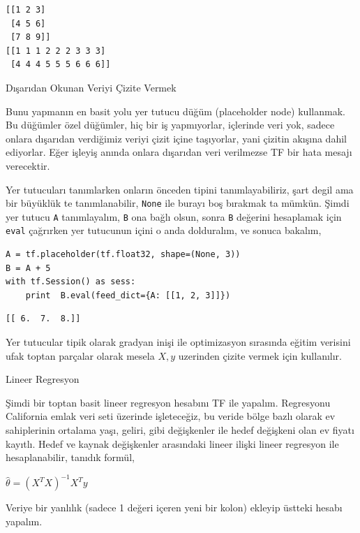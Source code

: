 \documentclass[12pt,fleqn]{article}\usepackage{../../common}
\begin{document}
\begin{verbatim}
[[1 2 3]
 [4 5 6]
 [7 8 9]]
[[1 1 1 2 2 2 3 3 3]
 [4 4 4 5 5 5 6 6 6]]
\end{verbatim}


Dışarıdan Okunan Veriyi Çizite Vermek

Bunu yapmanın en basit yolu yer tutucu düğüm (placeholder node)
kullanmak. Bu düğümler özel düğümler, hiç bir iş yapmıyorlar, içlerinde
veri yok, sadece onlara dışarıdan verdiğimiz veriyi çizit içine taşıyorlar,
yani çizitin akışına dahil ediyorlar. Eğer işleyiş anında onlara dışarıdan
veri verilmezse TF bir hata mesajı verecektir.

Yer tutucuları tanımlarken onların önceden tipini tanımlayabiliriz, şart
degil ama bir büyüklük te tanımlanabilir, \verb!None! ile burayı boş
bırakmak ta mümkün. Şimdi yer tutucu \verb!A! tanımlayalım, \verb!B! ona
bağlı olsun, sonra \verb!B! değerini hesaplamak için \verb!eval! çağrırken
yer tutucunun içini o anda dolduralım, ve sonuca bakalım,

\begin{verbatim}
A = tf.placeholder(tf.float32, shape=(None, 3))
B = A + 5
with tf.Session() as sess:
    print  B.eval(feed_dict={A: [[1, 2, 3]]})
\end{verbatim}

\begin{verbatim}
[[ 6.  7.  8.]]
\end{verbatim}

Yer tutucular tipik olarak gradyan inişi ile optimizasyon sırasında eğitim
verisini ufak toptan parçalar olarak mesela $X,y$ uzerinden çizite vermek
için kullanılır.

Lineer Regresyon

Şimdi bir toptan basit lineer regresyon hesabını TF ile yapalım. Regresyonu
California emlak veri seti üzerinde işleteceğiz, bu veride bölge bazlı
olarak ev sahiplerinin ortalama yaşı, geliri, gibi değişkenler ile hedef
değişkeni olan ev fiyatı kayıtlı. Hedef ve kaynak değişkenler arasındaki
lineer ilişki lineer regresyon ile hesaplanabilir, tanıdık formül,

$\hat{\theta} = (X^TX )^{-1} X^T y $

Veriye bir yanlılık (sadece 1 değeri içeren yeni bir kolon) ekleyip üstteki
hesabı yapalım.
\end{document}
